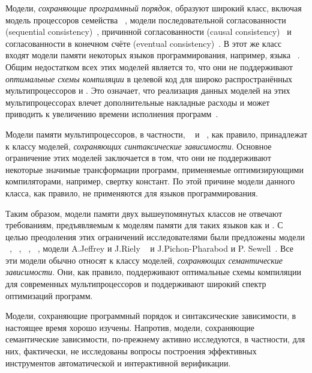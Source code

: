 Модели, \emph{сохраняющие программный порядок}, образуют широкий класс,
включая модель \TSO процессоров семейства \Intel~\autocite{Sewell-al:CACM10},
модели последовательной согласованности (sequential consistency)~\autocite{Lamport:TC79},
причинной согласованности (causal consistency)~\autocite{Lahav-Boker:PLDI2020}
и согласованности в конечном счёте (eventual consistency)~\autocite{Jagadeesan-al:ESOP2018}. 
В этот же класс входят  модели памяти некоторых языков программирования, например,
языка \OCaml~\autocite{Dolan-al:PLDI18}.
Общим недостатком всех этих моделей является то,
что они не поддерживают \emph{оптимальные схемы компиляции} 
в целевой код для широко распространённых мультипроцессоров \ARM и \POWER.
Это означает, что реализация данных моделей на этих мультипроцессорах
влечет дополнительные накладные расходы и может приводить
к увеличению времени исполнения программ~\autocite{Ou-Demsky:OOPSLA18}. 

Модели памяти мультипроцессоров,
в частности, \ARM~\autocite{Pulte-al:POPL18} и \POWER~\autocite{Sarkar-al:PLDI11}, 
как правило, принадлежат к классу моделей, \emph{сохраняющих синтаксические зависимости}. 
Основное ограничение этих моделей заключается в том, 
что они не поддерживают некоторые значимые трансформации программ, 
применяемые оптимизирующими компиляторами, например, свертку констант.
По этой причине модели данного класса, как правило,
не применяются для языков программирования.  

Таким образом, модели памяти двух вышеупомянутых классов 
не отвечают требованиям, предъявляемым к моделям памяти для таких языков как \CPP и \Java. 
С целью преодоления этих ограничений исследователями были предложены модели  
\Prm~\autocite{Kang-al:POPL17}, \Wkm~\autocite{Chakraborty-Vafeiadis:POPL19}, 
\MRD~\autocite{Paviotti-al:ESOP20}, \PwP~\autocite{Jagadeesan-al:OOPSLA2020},
модели A.Jeffrey и J.Riely ~\autocite{Jeffrey-Riely:LICS16} и J.Pichon-Pharabod и P. Sewell~\autocite{PichonPharabod-Sewell:POPL16}.
Все эти модели обычно относят к классу моделей, \emph{сохраняющих семантические зависимости}.
Они, как правило, поддерживают оптимальные схемы компиляции
для современных мультипроцессоров и поддерживают широкий спектр оптимизаций программ.

Модели, сохраняющие программный порядок и синтаксические зависимости, 
в настоящее время хорошо изучены. Напротив, модели, 
сохраняющие семантические зависимости, по-прежнему активно исследуются,
в частности, для них, фактически, не исследованы
вопросы построения эффективных инструментов автоматической и интерактивной верификации. 

